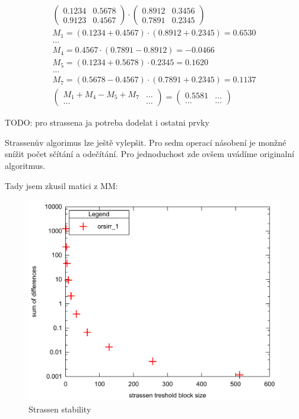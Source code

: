 \documentclass[thesis=B,czech]{FITthesis}[2012/06/26]
\begin{document}
\begin{align}
\begin{pmatrix}
 0.1234 & 0.5678 \\
 0.9123 & 0.4567
\end{pmatrix} \cdot \begin{pmatrix}
 0.8912 & 0.3456 \\
 0.7891 & 0.2345
\end{pmatrix} \\
M_{1} = (0.1234 + 0.4567) \cdot (0.8912 + 0.2345) = 0.6530  \\
\hdots \\
M_{4} = 0.4567 \cdot (0.7891 - 0.8912) = -0.0466 \\
M_{5} = (0.1234 + 0.5678) \cdot 0.2345 = 0.1620 \\
\hdots \\
M_{7} = (0.5678 - 0.4567) \cdot (0.7891 + 0.2345) = 0.1137 \\
 \begin{pmatrix}
 M_{1} + M_{4} - M_{5} + M_{7} & \hdots \\
 \hdots & \hdots
\end{pmatrix} = \begin{pmatrix}
 0.5581 & \hdots \\
 \hdots & \hdots
\end{pmatrix}
\end{align}



TODO: pro strassena ja potreba dodelat i ostatni prvky

Strassenův algorimus lze ještě vylepšit. Pro sedm operací násobení je monžné snížit počet sčítání a odečítání. Pro jednoduchost zde ovšem uvádíme originalní algoritmus.

Tady jsem zkusil matici z MM:

\begin{figure}\centering
	\includegraphics[width=\textwidth]{./images/strassen_stability}
	\caption{Strassen stability}
	\label{fig:Ukázka numerické stability Strassenova algoritmu}
\end{figure}
\end{document}
